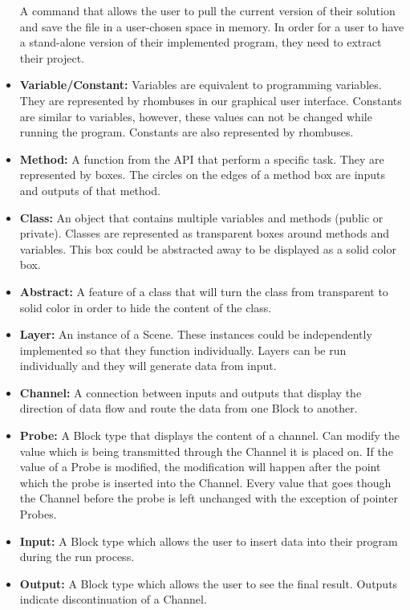 \documentclass[journal,10pt,onecolumn,compsoc]{IEEEtran} \usepackage[margin=1.0in]{geometry} \usepackage{pdfpages} \usepackage{graphicx}
\begin{document}
\begin{itemize}
		A command that allows the user to pull the current version of their solution and save the file in a user-chosen space in memory.
		In order for a user to have a stand-alone version of their implemented program, they need to extract their project.\\
	\item \textbf{Variable/Constant:}
		Variables are equivalent to programming variables. They are represented by rhombuses in our graphical user interface.
		Constants are similar to  variables, however, these values can not be changed while running the program.
		Constants are also represented by rhombuses.\\
	\item \textbf{Method:}
		A function from the API that perform a specific task. They are represented by boxes.
		The circles on the edges of a method box are inputs and outputs of that method.\\
	\item \textbf{Class:} 
		An object that contains multiple variables and methods (public or private).
		Classes are represented as transparent boxes around methods and variables. This box could be abstracted away to be displayed as a solid color box.\\
	\item \textbf{Abstract:}
		A feature of a class that will turn the class from transparent to solid color in order to hide the content of the class.\\
	\item \textbf{Layer:} 
		An instance of a Scene. 
		These instances could be independently implemented so that they function individually.
		Layers can be run individually and they will generate data from input.\\
	\item \textbf{Channel:}
		 A connection between inputs and outputs that display the direction of data flow and route the data from one Block to another.\\
	\item \textbf{Probe:}
		A Block type that displays the content of a channel.
		Can modify the value which is being transmitted through the Channel it is placed on.
		If the value of a Probe is modified, the modification will happen after the point which the probe is inserted into the Channel.
		Every value that goes though the Channel before the probe is left unchanged with the exception of pointer Probes.\\
	\item \textbf{Input:}
		A Block type which allows the user to insert data into their program during the run process.\\
	\item \textbf{Output:}
		A Block type which allows the user to see the final result. Outputs indicate discontinuation of a Channel.\\
\end{itemize}
\end{document}
